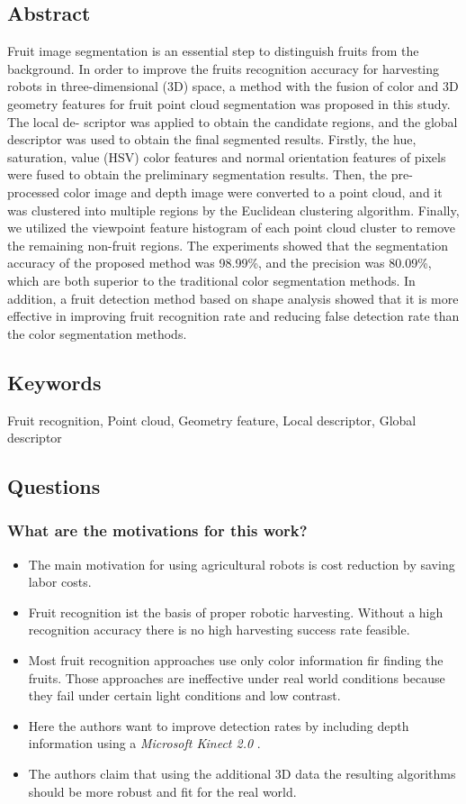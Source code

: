 \subsection*{Abstract}
Fruit image segmentation is an essential step to distinguish fruits from the background. In order to improve the
fruits recognition accuracy for harvesting robots in three-dimensional (3D) space, a method with the fusion of
color and 3D geometry features for fruit point cloud segmentation was proposed in this study. The local de-
scriptor was applied to obtain the candidate regions, and the global descriptor was used to obtain the final
segmented results. Firstly, the hue, saturation, value (HSV) color features and normal orientation features of
pixels were fused to obtain the preliminary segmentation results. Then, the pre-processed color image and depth
image were converted to a point cloud, and it was clustered into multiple regions by the Euclidean clustering
algorithm. Finally, we utilized the viewpoint feature histogram of each point cloud cluster to remove the
remaining non-fruit regions. The experiments showed that the segmentation accuracy of the proposed method
was 98.99\%, and the precision was 80.09\%, which are both superior to the traditional color segmentation
methods. In addition, a fruit detection method based on shape analysis showed that it is more effective in
improving fruit recognition rate and reducing false detection rate than the color segmentation methods.

\subsection*{Keywords}
Fruit recognition, Point cloud, Geometry feature, Local descriptor, Global descriptor

\subsection*{Questions}
\subsubsection*{What are the motivations for this work?}
\begin{itemize}
    \item The main motivation for using agricultural robots is cost reduction by saving labor costs.
    \item Fruit recognition ist the basis of proper robotic harvesting. Without a high recognition accuracy there is no high harvesting success rate feasible.
    \item Most fruit recognition approaches use only color information fir finding the fruits. Those approaches are ineffective under real world conditions because they fail under certain light conditions and low contrast. 
    \item Here the authors want to improve detection rates by including depth information using a \emph{Microsoft Kinect 2.0} .
    \item The authors claim that using the additional 3D data the resulting algorithms should be more robust and fit for the real world.
\end{itemize}
